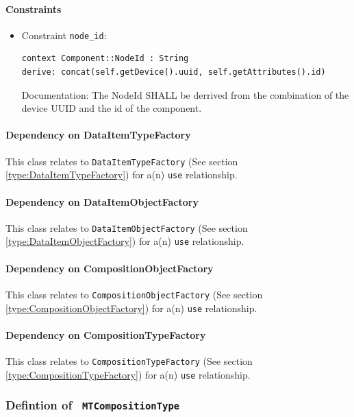 \paragraph{Constraints}
\begin{itemize}
\item Constraint \texttt{node_id}: 
   \indent \begin{lstlisting}
context Component::NodeId : String 
derive: concat(self.getDevice().uuid, self.getAttributes().id)
\end{lstlisting}
Documentation: The NodeId SHALL be derrived from the combination of the device UUID and the id of the component. 

\end{itemize}
\paragraph{Dependency on DataItemTypeFactory}

This class relates to \texttt{DataItemTypeFactory} (See section \ref{type:DataItemTypeFactory}) for a(n) \texttt{use} relationship.

\paragraph{Dependency on DataItemObjectFactory}

This class relates to \texttt{DataItemObjectFactory} (See section \ref{type:DataItemObjectFactory}) for a(n) \texttt{use} relationship.

\paragraph{Dependency on CompositionObjectFactory}

This class relates to \texttt{CompositionObjectFactory} (See section \ref{type:CompositionObjectFactory}) for a(n) \texttt{use} relationship.

\paragraph{Dependency on CompositionTypeFactory}

This class relates to \texttt{CompositionTypeFactory} (See section \ref{type:CompositionTypeFactory}) for a(n) \texttt{use} relationship.

\FloatBarrier
\subsubsection{Defintion of \texttt{ MTCompositionType}} \label{type:MTCompositionType}

